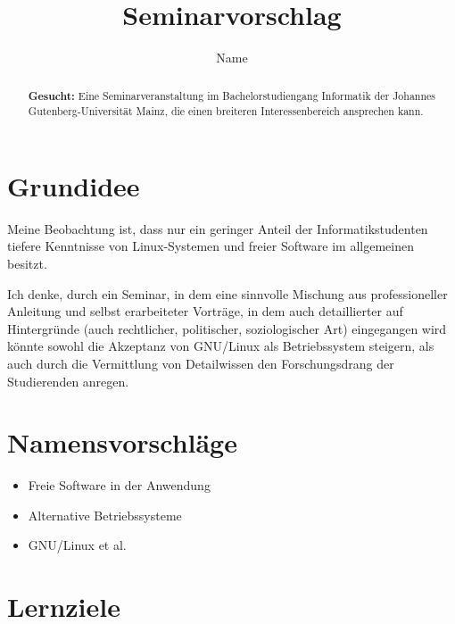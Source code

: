 \documentclass[a4paper]{scrartcl}
\date{}
\author{Name}
\title{Seminarvorschlag}
\begin{document}
\maketitle

\begin{abstract}
\textbf{Gesucht:} Eine Seminarveranstaltung im Bachelorstudiengang Informatik der 
Johannes Gutenberg-Universität Mainz, die einen breiteren Interessenbereich
ansprechen kann.
\end{abstract}

\section{Grundidee}

Meine Beobachtung ist, dass nur ein geringer Anteil der Informatikstudenten
tiefere Kenntnisse von Linux-Systemen und freier Software im allgemeinen besitzt.

Ich denke, durch ein Seminar, in dem eine sinnvolle Mischung aus professioneller
Anleitung und selbst erarbeiteter Vorträge, in dem auch detaillierter auf
Hintergründe (auch rechtlicher, politischer, soziologischer Art) eingegangen 
wird könnte sowohl die Akzeptanz von GNU/Linux als Betriebssystem steigern,
als auch durch die Vermittlung von Detailwissen den Forschungsdrang der
Studierenden anregen.

\section{Namensvorschläge}

\begin{itemize}
\item Freie Software in der Anwendung
\item Alternative Betriebssysteme
\item GNU/Linux et al.
\end{itemize}

\section{Lernziele}
\end{document}

